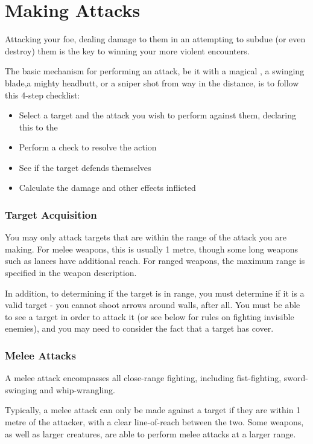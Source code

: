 
\chapter{Making Attacks}\label{S:Attacks} 

Attacking your foe, dealing damage to them in an attempting to subdue (or even destroy) them is the key to winning your more violent encounters. 

The basic mechanism for performing an attack, be it with a magical , a swinging blade,a mighty headbutt, or a sniper shot from way in the distance, is to follow this 4-step checklist:

\begin{itemize}
	\item Select a target and the attack you wish to perform against them, declaring this to the 
	\item Perform a check to resolve the action 
	\item See if the target defends themselves
	\item Calculate the damage and other effects inflicted
\end{itemize}

\subsection{Target Acquisition}

You may only attack targets that are within the range of the attack you are making. For melee weapons, this is usually 1 metre, though some long weapons such as lances have additional reach. For ranged weapons, the maximum range is specified in the weapon description. 

In addition, to determining if the target is in range, you must determine if it is a valid target - you cannot shoot arrows around walls, after all. You must be able to see a target in order to attack it (or see below for rules on fighting invisible enemies), and you may need to consider the fact that a target has cover. 


\subsection{Melee Attacks}

A melee attack encompasses all close-range fighting, including fist-fighting, sword-swinging and whip-wrangling. 

Typically, a melee attack can only be made against a target if they are within 1 metre of the attacker, with a clear line-of-reach between the two. Some weapons, as well as larger creatures, are able to perform melee attacks at a larger range.  

